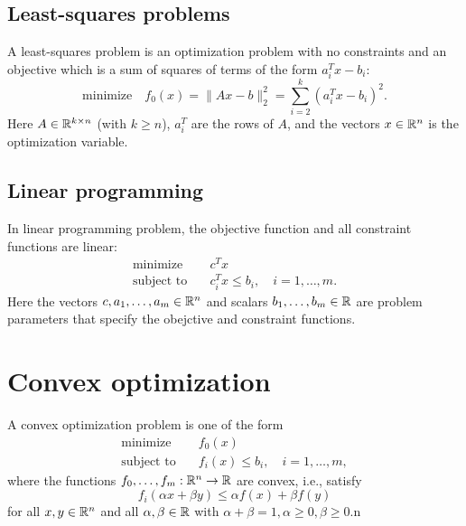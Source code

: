 \documentclass[11pt,oneside,a4paper]{book}
\theoremstyle{definition}
\DeclareRobustCommand{\[}{\begin{equation}}
\DeclareRobustCommand{\]}{\end{equation}}
\begin{document}
\subsection{Least-squares problems}

A least-squares problem is an optimization problem with no constraints and an objective which is a sum of squares of terms of the form $ a_i^T x-b_i $:
\begin{equation}
\text{minimize}\quad f_0(x)=\|Ax-b\|_2^2=\sum_{i=2}^k (a_i^Tx-b_i)^2.
\end{equation}
Here $ A\in\mathbb{R}^{k\times n} $ (with $ k\geq n $), $ a_i^T $ are the rows of $ A $, and the vectors $ x\in\mathbb{R}^n $ is the optimization variable.

\subsection{Linear programming}

In linear programming problem, the objective function and all constraint functions are linear:
\begin{equation}
\begin{split}
\text{minimize}\quad&c^Tx \\
\text{subject to}\quad& c_i^Tx\leq b_i,\quad i=1,\dots, m.
\end{split}
\end{equation}
Here the vectors $ c,a_1,\dots,a_m\in\mathbb{R}^n $ and scalars $ b_1,\dots,b_m\in\mathbb{R} $ are problem parameters that specify the obejctive and constraint functions.

\section{Convex optimization}

A convex optimization problem is one of the form
\begin{equation}
\begin{split}
\text{minimize}\quad &f_0(x) \\
\text{subject to}\quad& f_i(x)\leq b_i,\quad i=1,\dots,m,
\end{split}
\end{equation}
where the functions $ f_0,\dots,f_m:\mathbb{R}^n\to\mathbb{R} $ are convex, i.e., satisfy
\begin{equation}
f_i(\alpha x+\beta y)\leq \alpha f(x)+\beta f(y)
\end{equation}
for all $ x,y\in\mathbb{R}^n $ and all $ \alpha,\beta\in\mathbb{R} $ with $ \alpha+\beta=1,\alpha\geq 0, \beta\geq 0 $.n
\end{document}
